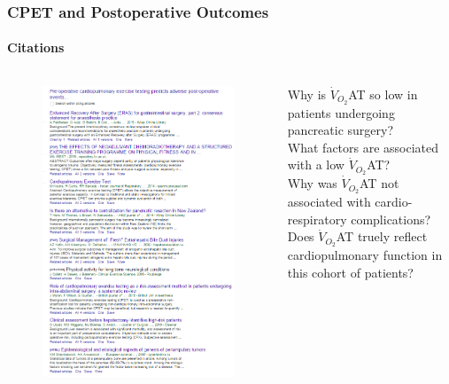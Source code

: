 \documentclass[10pt]{beamer}
\begin{document}
\begin{frame}
	\frametitle{CPET and Postoperative Outcomes}
	\framesubtitle{Citations}
	\begin{columns}[c]
		\begin{figure}
			\centering
			\includegraphics[width=\textwidth]{cpet_citations}
		\end{figure}
	
	Why is $\dot{V}_{O_2}$AT so low in patients undergoing pancreatic surgery?\\
	\medskip
	What factors are associated with a low $\dot{V}_{O_2}$AT?\\
	\medskip
	Why was $\dot{V}_{O_2}$AT not associated with cardio-respiratory complications?\\
	\medskip
	Does $\dot{V}_{O_2}$AT truely reflect cardiopulmonary function in this cohort of patients?\\	
	\end{columns}
\end{frame}
\end{document}
